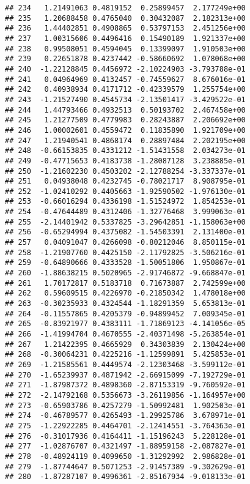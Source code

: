 \documentclass[
]{article}
\begin{document}
\begin{verbatim}
## 234   1.21491063 0.4819152  0.25899457  2.177249e+00
## 235   1.20688458 0.4765040  0.30432087  2.182313e+00
## 236   1.44402851 0.4908865  0.53797153  2.451256e+00
## 237   1.00315606 0.4496416  0.15490189  1.921337e+00
## 238   0.99508051 0.4594045  0.13399097  1.910503e+00
## 239   0.22651878 0.4237442 -0.58660692  1.078068e+00
## 240  -1.22128845 0.4456972 -2.10224903 -3.793788e-01
## 241   0.04964969 0.4132457 -0.74559627  8.676016e-01
## 242   0.40938934 0.4171712 -0.42339579  1.255754e+00
## 243  -1.21527490 0.4545734 -2.13501417 -3.429522e-01
## 244   1.44793466 0.4932513  0.50193702  2.467458e+00
## 245   1.21277509 0.4779983  0.28243887  2.206692e+00
## 246   1.00002601 0.4559472  0.11835890  1.921709e+00
## 247   1.21940541 0.4868174  0.28897484  2.202195e+00
## 248  -0.66153835 0.4331212 -1.51431558  2.034273e-01
## 249  -0.47715653 0.4183738 -1.28087128  3.238885e-01
## 250  -1.21602230 0.4503202 -2.12788254 -3.337337e-01
## 251   0.04938048 0.4232745 -0.78021717  8.908795e-01
## 252  -1.02410292 0.4405663 -1.92590502 -1.976130e-01
## 253  -0.66016294 0.4336198 -1.51524972  1.854253e-01
## 254  -0.47644489 0.4312406 -1.32776468  3.999063e-01
## 255  -2.14401942 0.5337825 -3.29642851 -1.158063e+00
## 256  -0.65294994 0.4375082 -1.54503391  2.131400e-01
## 257   0.04091047 0.4266098 -0.80212046  8.850115e-01
## 258  -1.21907760 0.4425150 -2.11792825 -3.506216e-01
## 259  -0.64890666 0.4333528 -1.50051806  1.950867e-01
## 260  -1.88638215 0.5020965 -2.91746872 -9.668847e-01
## 261   1.70172817 0.5183718  0.71673887  2.742599e+00
## 262   0.59609515 0.4226970 -0.21850342  1.478018e+00
## 263  -0.30235933 0.4324544 -1.18291359  5.653813e-01
## 264  -0.11557865 0.4205379 -0.94899452  7.009345e-01
## 265  -0.83921977 0.4383111 -1.71869123 -4.141056e-05
## 266  -1.41994704 0.4670555 -2.40371498 -5.263854e-01
## 267   1.21422395 0.4665929  0.34303839  2.130424e+00
## 268  -0.30064231 0.4225216 -1.12599891  5.425853e-01
## 269  -1.21585561 0.4449574 -2.12303468 -3.599112e-01
## 270  -1.65239937 0.4871942 -2.66915099 -7.192729e-01
## 271  -1.87987372 0.4898360 -2.87153319 -9.760592e-01
## 272  -2.14792168 0.5356673 -3.26119856 -1.164957e+00
## 273  -0.65903786 0.4257279 -1.50992481  1.902503e-01
## 274  -0.46789577 0.4265493 -1.29925786  3.678971e-01
## 275  -1.22922285 0.4464701 -2.12414551 -3.764363e-01
## 276  -0.31017936 0.4164411 -1.15196243  5.228128e-01
## 277  -1.02876707 0.4321497 -1.88959158 -2.087827e-01
## 278  -0.48924119 0.4099650 -1.31292992  2.986828e-01
## 279  -1.87744647 0.5071253 -2.91457389 -9.302629e-01
## 280  -1.87287107 0.4996361 -2.85167934 -9.018133e-01

\end{verbatim}
\end{document}
